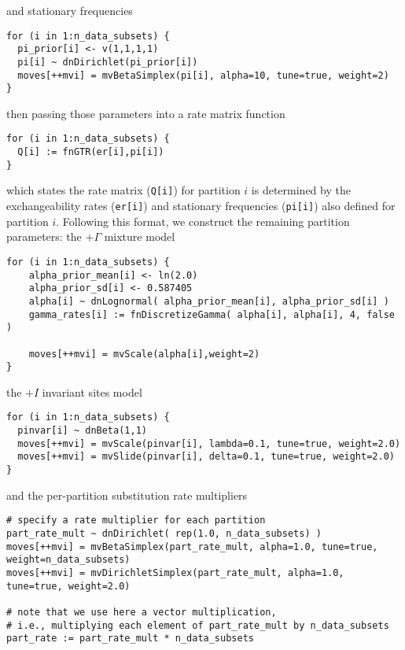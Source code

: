 and stationary frequencies

{\tt \small \begin{snugshade*}
\begin{lstlisting}
for (i in 1:n_data_subsets) {
  pi_prior[i] <- v(1,1,1,1)
  pi[i] ~ dnDirichlet(pi_prior[i])
  moves[++mvi] = mvBetaSimplex(pi[i], alpha=10, tune=true, weight=2)
}
\end{lstlisting}
\end{snugshade*}}

then passing those parameters into a rate matrix function

{\tt \small \begin{snugshade*}
\begin{lstlisting}
for (i in 1:n_data_subsets) {
  Q[i] := fnGTR(er[i],pi[i]) 
}
\end{lstlisting}
\end{snugshade*}}

which states the rate matrix ({\tt Q[i]}) for partition $i$ is determined by the exchangeability rates ({\tt er[i]}) and stationary frequencies ({\tt pi[i]}) also defined for partition $i$.
Following this format, we construct the remaining partition parameters: the $+\Gamma$ mixture model

{\tt \small \begin{snugshade*}
\begin{lstlisting}
for (i in 1:n_data_subsets) {
    alpha_prior_mean[i] <- ln(2.0)
    alpha_prior_sd[i] <- 0.587405
    alpha[i] ~ dnLognormal( alpha_prior_mean[i], alpha_prior_sd[i] )
    gamma_rates[i] := fnDiscretizeGamma( alpha[i], alpha[i], 4, false )

    moves[++mvi] = mvScale(alpha[i],weight=2)
}
\end{lstlisting}
\end{snugshade*}}

the $+I$ invariant sites model

{\tt \small \begin{snugshade*}
\begin{lstlisting}
for (i in 1:n_data_subsets) {
  pinvar[i] ~ dnBeta(1,1)
  moves[++mvi] = mvScale(pinvar[i], lambda=0.1, tune=true, weight=2.0)
  moves[++mvi] = mvSlide(pinvar[i], delta=0.1, tune=true, weight=2.0)
}
\end{lstlisting}
\end{snugshade*}}

and the per-partition substitution rate multipliers 
{\tt \small \begin{snugshade*}
\begin{lstlisting}
# specify a rate multiplier for each partition
part_rate_mult ~ dnDirichlet( rep(1.0, n_data_subsets) )
moves[++mvi] = mvBetaSimplex(part_rate_mult, alpha=1.0, tune=true, weight=n_data_subsets)
moves[++mvi] = mvDirichletSimplex(part_rate_mult, alpha=1.0, tune=true, weight=2.0)

# note that we use here a vector multiplication, 
# i.e., multiplying each element of part_rate_mult by n_data_subsets
part_rate := part_rate_mult * n_data_subsets\end{lstlisting}
\end{snugshade*}}


